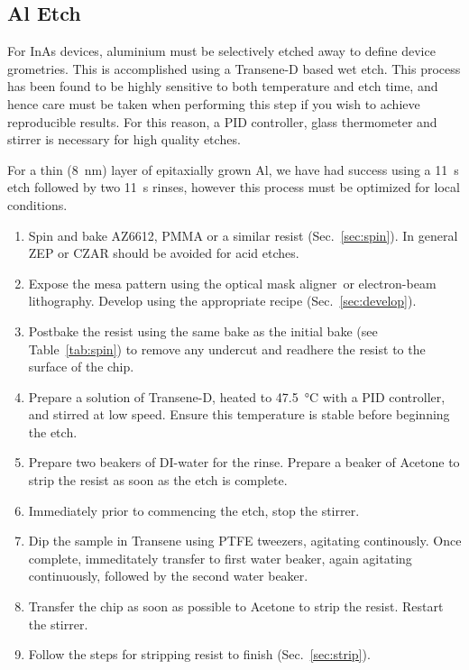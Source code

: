 \subsection{Al Etch}
\label{sec:transene}
For InAs devices, aluminium must be selectively etched away to define device grometries. This is accomplished
using a Transene-D based wet etch. This process has been found to be highly sensitive to both temperature
and etch time, and hence care must be taken when performing this step if you wish to achieve reproducible
results. For this reason, a PID controller, glass thermometer and stirrer is necessary for high quality etches.

For a thin (\SI{8}{\nano\meter}) layer of epitaxially grown Al, we have had success using a \SI{11}{\second} etch
followed by two \SI{11}{\second}  rinses, however this process must be optimized for local conditions.



\begin{enumerate}
    \item Spin and bake AZ6612, PMMA or a similar resist (Sec.~\ref{sec:spin}). In general ZEP or CZAR should be avoided for acid etches.
    \item Expose the mesa pattern using the optical mask aligner\ or electron-beam lithography. Develop using the appropriate recipe (Sec.~\ref{sec:develop}).
    \item Postbake the resist using the same bake as the initial bake (see Table~\ref{tab:spin}) to remove any undercut and readhere the resist to the surface of the chip.
    \item Prepare a solution of Transene-D, heated to \SI{47.5}{\celsius} with a PID controller, and stirred at low speed. Ensure this temperature is stable before beginning the etch.
    \item Prepare two beakers of DI-water for the rinse. Prepare a beaker of Acetone to strip the resist as soon as the etch is complete.
    \item Immediately prior to commencing the etch, stop the stirrer.
    \item Dip the sample in Transene using PTFE tweezers, agitating continously. Once complete, immeditately transfer to first water beaker, again agitating continuously, followed by the second water beaker.
    \item Transfer the chip as soon as possible to Acetone to strip the resist. Restart the stirrer.
    \item Follow the steps for stripping resist to finish (Sec.~\ref{sec:strip}).
\end{enumerate}

